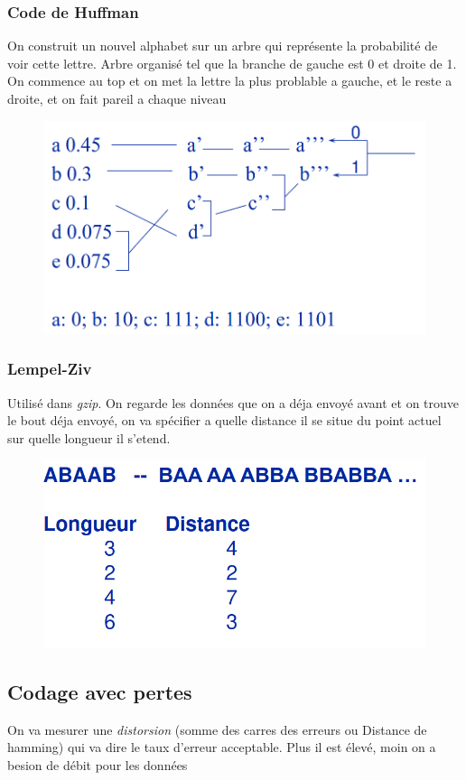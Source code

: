 \documentclass[12pt]{article}
\begin{document}
		\subsubsection{Code de Huffman}
			On construit un nouvel alphabet sur un arbre qui représente la probabilité de voir cette lettre. Arbre organisé tel que la branche de gauche est 0 et droite de 1. On commence au top et on met la lettre la plus problable a gauche, et le reste a droite, et on fait pareil a chaque niveau
			
			\begin{figure}[H]
				\centering
				\includegraphics[width=.5\textwidth]{img/Compression/Huffman.png}
			\end{figure}
			
		\subsubsection{Lempel-Ziv}
			Utilisé dans \textit{gzip}. On regarde les données que on a déja envoyé avant et on trouve le bout déja envoyé, on va spécifier a quelle distance il se situe du point actuel sur quelle longueur il s'etend.

			\begin{figure}[H]
				\centering
				\includegraphics[width=.5\textwidth]{img/Compression/L77.png}
			\end{figure}
			
	\subsection{Codage avec pertes}
		On va mesurer une \textit{distorsion} (somme des carres des erreurs ou Distance de hamming) qui va dire le taux d'erreur acceptable. Plus il est élevé, moin on a besion de débit pour les données
		
\end{document}
